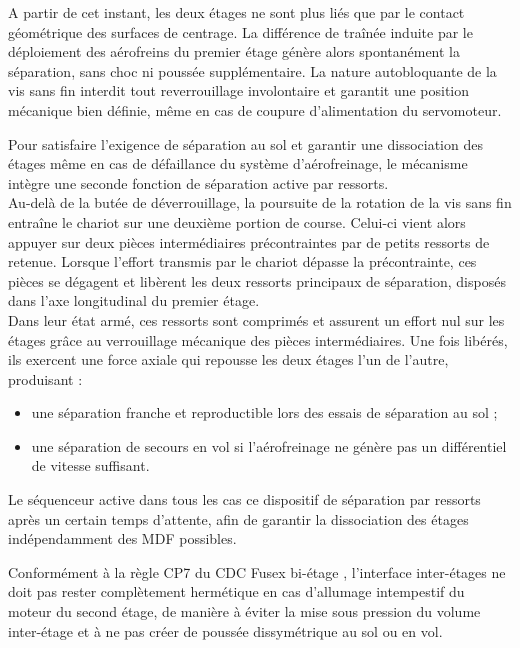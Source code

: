 A partir de cet instant, les deux étages ne sont plus liés que par le contact géométrique des surfaces de centrage. La
différence de traînée induite par le déploiement des aérofreins du premier étage génère alors spontanément la séparation, sans
choc ni poussée supplémentaire. La nature autobloquante de la vis sans fin interdit tout reverrouillage involontaire et garantit
une position mécanique bien définie, même en cas de coupure d'alimentation du servomoteur.


Pour satisfaire l'exigence de séparation au sol et garantir une dissociation des étages même en cas de défaillance du système
d'aérofreinage, le mécanisme intègre une seconde fonction de séparation active par ressorts.\\

Au-delà de la butée de déverrouillage, la poursuite de la rotation de la vis sans fin entraîne le chariot sur une deuxième
portion de course. Celui-ci vient alors appuyer sur deux pièces intermédiaires précontraintes par de petits ressorts de
retenue. Lorsque l'effort transmis par le chariot dépasse la précontrainte, ces pièces se dégagent et libèrent les deux ressorts
principaux de séparation, disposés dans l'axe longitudinal du premier étage.\\

Dans leur état armé, ces ressorts sont comprimés et assurent un effort nul sur les étages grâce au verrouillage mécanique des
pièces intermédiaires. Une fois libérés, ils exercent une force axiale qui repousse les deux étages l'un de l'autre, produisant :
\begin{itemize}
    \item une séparation franche et reproductible lors des essais de séparation au sol ;
    \item une séparation de secours en vol si l'aérofreinage ne génère pas un différentiel de vitesse suffisant.\\
\end{itemize}

Le séquenceur active dans tous les cas ce dispositif de séparation par ressorts après un certain temps d'attente, afin de
garantir la dissociation des étages indépendamment des \acrlong{MDF} possibles.


Conformément à la règle CP7 du \acrshort{CDC} \gls{Fusex} bi-étage \cite[p.~59]{CDC_BiEtage}, l'interface inter-étages ne doit
pas rester complètement hermétique en cas d'allumage intempestif du moteur du second étage, de manière à éviter la mise sous
pression du volume inter-étage et à ne pas créer de poussée dissymétrique au sol ou en vol.\\

